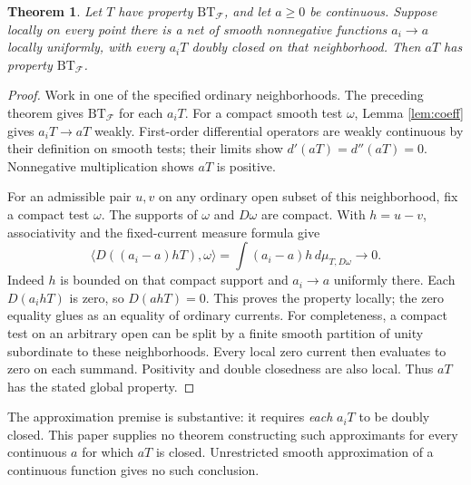\documentclass[11pt]{article}
\newtheorem{theorem}{Theorem}
\newcommand{\dp}{d'}
\newcommand{\ddp}{d''}
\newcommand{\BT}{\mathrm{BT}}
\begin{document}
\begin{theorem}\label{thm:limits}
Let $T$ have property $\BT_{\mathcal F}$, and let $a\geq0$ be continuous.
Suppose locally on every point there is a net of smooth nonnegative
functions $a_i\to a$ locally uniformly, with every $a_iT$ doubly closed
on that neighborhood. Then $aT$ has property $\BT_{\mathcal F}$.
\end{theorem}
\begin{proof}
Work in one of the specified ordinary neighborhoods. The preceding
theorem gives $\BT_{\mathcal F}$ for each $a_iT$. For a compact smooth
test $\omega$, Lemma \ref{lem:coeff} gives $a_iT\to aT$ weakly.
First-order differential operators are weakly continuous by their
definition on smooth tests; their limits show $\dp(aT)=\ddp(aT)=0$.
Nonnegative multiplication shows $aT$ is positive.

For an admissible pair $u,v$ on any ordinary open subset of this
neighborhood, fix a compact test $\omega$. The supports of $\omega$ and
$D\omega$ are compact. With $h=u-v$, associativity and the fixed-current
measure formula give
\[
 \langle D((a_i-a)hT),\omega\rangle
 =\int (a_i-a)h\,d\mu_{T,D\omega}\longrightarrow0.
\]
Indeed $h$ is bounded on that compact support and $a_i\to a$ uniformly
there. Each $D(a_i hT)$ is zero, so $D(ahT)=0$. This proves the property
locally; the zero equality glues as an equality of ordinary currents.
For completeness, a compact test on an arbitrary open can be split by a
finite smooth partition of unity subordinate to these neighborhoods.
Every local zero current then evaluates to zero on each summand. Positivity
and double closedness are also local. Thus $aT$ has the stated global
property.
\end{proof}

The approximation premise is substantive: it requires \emph{each}
$a_iT$ to be doubly closed. This paper supplies no theorem constructing
such approximants for every continuous $a$ for which $aT$ is closed.
Unrestricted smooth approximation of a continuous function gives no such
conclusion.
\end{document}
